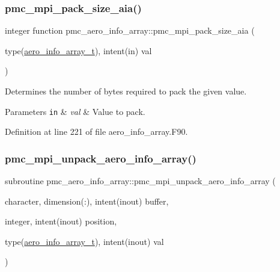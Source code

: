 \mbox{\label{namespacepmc__aero__info__array_a80e0fdcb7ccd8fde3594259863523ed9}} 
\subsubsection{\texorpdfstring{pmc\+\_\+mpi\+\_\+pack\+\_\+size\+\_\+aia()}{pmc\_mpi\_pack\_size\_aia()}}
{\footnotesize\ttfamily integer function pmc\+\_\+aero\+\_\+info\+\_\+array\+::pmc\+\_\+mpi\+\_\+pack\+\_\+size\+\_\+aia (\begin{DoxyParamCaption}\item[{type(\mbox{\hyperlink{structpmc__aero__info__array_1_1aero__info__array__t}{aero\+\_\+info\+\_\+array\+\_\+t}}), intent(in)}]{val }\end{DoxyParamCaption})}



Determines the number of bytes required to pack the given value. 


\begin{DoxyParams}[1]{Parameters}
\mbox{\tt in}  & {\em val} & Value to pack. \\
\hline
\end{DoxyParams}


Definition at line 221 of file aero\+\_\+info\+\_\+array.\+F90.

\mbox{\label{namespacepmc__aero__info__array_a1439690489e5c170ecc3b85db4f6cbd4}} 
\subsubsection{\texorpdfstring{pmc\+\_\+mpi\+\_\+unpack\+\_\+aero\+\_\+info\+\_\+array()}{pmc\_mpi\_unpack\_aero\_info\_array()}}
{\footnotesize\ttfamily subroutine pmc\+\_\+aero\+\_\+info\+\_\+array\+::pmc\+\_\+mpi\+\_\+unpack\+\_\+aero\+\_\+info\+\_\+array (\begin{DoxyParamCaption}\item[{character, dimension(\+:), intent(inout)}]{buffer,  }\item[{integer, intent(inout)}]{position,  }\item[{type(\mbox{\hyperlink{structpmc__aero__info__array_1_1aero__info__array__t}{aero\+\_\+info\+\_\+array\+\_\+t}}), intent(inout)}]{val }\end{DoxyParamCaption})}




